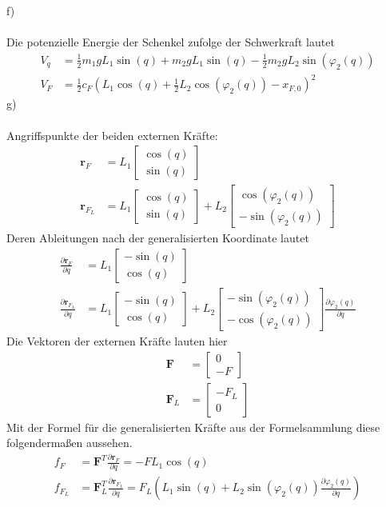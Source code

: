f) \\ \\
Die potenzielle Energie der Schenkel zufolge der Schwerkraft lautet
\begin{align*}
	V_q &= \frac{1}{2}m_1gL_1\sin(q) + m_2gL_1\sin(q) - \frac{1}{2}m_2gL_2\sin(\varphi_2(q)) \\
	V_F  &= \frac{1}{2}c_F\left(L_1\cos(q) + \frac{1}{2}L_2\cos(\varphi_2(q)) - x_{F,0}\right)^2
\end{align*}
\newpage
\noindent
g) \\ \\
Angriffspunkte der beiden externen Kräfte:
\begin{align*}
	\textbf{r}_F &= L_1\begin{bmatrix}
		\cos(q) \\
		\sin(q)
	\end{bmatrix}
	\\
	\textbf{r}_{F_L} &= L_1\begin{bmatrix}
	\cos(q) \\
	\sin(q)
	\end{bmatrix}
	+
	L_2 \begin{bmatrix}
		\cos(\varphi_2(q)) \\
		-\sin(\varphi_2(q))
	\end{bmatrix}
\end{align*}
Deren Ableitungen nach der generalisierten Koordinate lautet
\begin{align*}
	\frac{\partial \textbf{r}_F}{\partial q} &= L_1 \begin{bmatrix}
		-\sin(q) \\
		\cos(q)
	\end{bmatrix}
	\\
	\frac{\partial \textbf{r}_{F_L}}{\partial q} &= L_1\begin{bmatrix}
	-\sin(q) \\
	\cos(q)
	\end{bmatrix}
	+
	L_2\begin{bmatrix}
	-\sin(\varphi_2(q)) \\
	-\cos(\varphi_2(q))
	\end{bmatrix}
	\frac{\partial \varphi_2(q)}{\partial q}
\end{align*}
Die Vektoren der externen Kräfte lauten hier
\begin{align*}
	\textbf{F} &= \begin{bmatrix}
	0 \\
	- F
	\end{bmatrix}
	\\
	\textbf{F}_L &= \begin{bmatrix}
		-F_L \\
		0
	\end{bmatrix}
\end{align*}
Mit der Formel für die generalisierten Kräfte aus der Formelsammlung diese folgendermaßen aussehen.
\begin{align*}
	f_F &= \textbf{F}^T\frac{\partial \textbf{r}_F}{\partial q} = -FL_1\cos(q) \\
	f_{F_L} &= \textbf{F}_L^T \frac{\partial \textbf{r}_{F_L}}{\partial q} = F_L \left(L_1\sin(q) + L_2\sin(\varphi_2(q))\frac{\partial \varphi_2(q)}{\partial q}\right)
\end{align*}